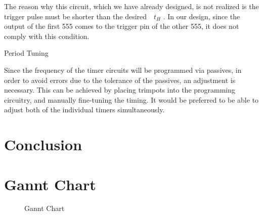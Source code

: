 \documentclass[12pt, a4paper]{article}
\begin{document}
     The reason why this circuit, which we have already designed, is not realized is the trigger pulse must be shorter than the desired
      $ \texttt{ }t_H$ . In our design, since the output of the first 555 comes to the trigger pin of the other 555, it does not comply with this condition.
 
     
     \bigskip
     Period Tuning
     
     Since the frequency of the timer circuits will be programmed via passives, in order to avoid errors due to the tolerance of the passives, an adjustment is necessary. This can be achieved by placing trimpots into the programming circuitry, and manually fine-tuning the timing. It would be preferred to be able to adjust both of the individual timers simultaneously.
     
      \pagebreak
     \section{Conclusion}
     
     \pagebreak
    \section{Gannt Chart}

        \begin{figure}[H]\centering
                \caption{Gannt Chart}
        \end{figure}
\end{document}
